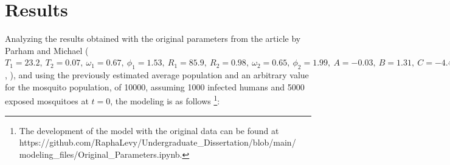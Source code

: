 \chapter{Results}


Analyzing the results obtained with the original parameters from 
the article by Parham and Michael 
($T_1=23.2, \ T_2=0.07, \ \omega_1=0.67, \ \phi_1=1.53, \ R_1=85.9, \ R_2=0.98, 
\ \omega_2=0.65, \ \phi_2=1.99, \ A=-0.03, \ B=1.31, \ C=-4.4, \ b_1=0.04, \ 
b_2 = 0.09, \ T_{min}=14.5, \ \gamma= 1/120, \ R_L = 50, \ c_1=0.00554, \ 
c_2=-0.06737$ \cite{Parham2010}, \cite{OKUNEYE201772}), and using 
the previously estimated average population and an arbitrary value 
for the mosquito population, of 10000, assuming 1000 infected humans and 
5000 exposed mosquitoes at $t=0$, the modeling is as follows
\footnote{The development of the model with the original data can be found at 
https://github.com/RaphaLevy/Undergraduate\_Dissertation/blob/main/
\\modeling\_files/Original\_Parameters.ipynb.}: 







